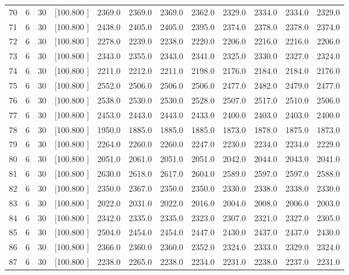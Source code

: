 \documentclass[12pt,a4paper]{article}
\begin{document}
\begin{center}
{\begin{tabular}{r r r r r r r r r r r r}
  70&  6& 30&[100.800   ]&  2369.0&  2369.0&  2369.0&  2362.0&  2329.0&  2334.0&  2334.0&  2329.0\\[-0.02in]
  71&  6& 30&[100.800   ]&  2438.0&  2405.0&  2405.0&  2395.0&  2374.0&  2378.0&  2378.0&  2374.0\\[-0.02in]
  72&  6& 30&[100.800   ]&  2278.0&  2239.0&  2238.0&  2220.0&  2206.0&  2216.0&  2216.0&  2206.0\\[-0.02in]
  73&  6& 30&[100.800   ]&  2343.0&  2355.0&  2343.0&  2341.0&  2325.0&  2330.0&  2327.0&  2324.0\\[-0.02in]
  74&  6& 30&[100.800   ]&  2211.0&  2212.0&  2211.0&  2198.0&  2176.0&  2184.0&  2184.0&  2176.0\\[-0.02in]
  75&  6& 30&[100.800   ]&  2552.0&  2506.0&  2506.0&  2506.0&  2477.0&  2482.0&  2479.0&  2477.0\\[-0.02in]
  76&  6& 30&[100.800   ]&  2538.0&  2530.0&  2530.0&  2528.0&  2507.0&  2517.0&  2510.0&  2506.0\\[-0.02in]
  77&  6& 30&[100.800   ]&  2453.0&  2443.0&  2443.0&  2433.0&  2400.0&  2403.0&  2403.0&  2400.0\\[-0.02in]
  78&  6& 30&[100.800   ]&  1950.0&  1885.0&  1885.0&  1885.0&  1873.0&  1878.0&  1875.0&  1873.0\\[-0.02in]
  79&  6& 30&[100.800   ]&  2264.0&  2260.0&  2260.0&  2247.0&  2230.0&  2234.0&  2234.0&  2229.0\\[-0.02in]
  80&  6& 30&[100.800   ]&  2051.0&  2061.0&  2051.0&  2051.0&  2042.0&  2044.0&  2043.0&  2041.0\\[-0.02in]
  81&  6& 30&[100.800   ]&  2630.0&  2618.0&  2617.0&  2604.0&  2589.0&  2597.0&  2597.0&  2588.0\\[-0.02in]
  82&  6& 30&[100.800   ]&  2350.0&  2367.0&  2350.0&  2350.0&  2330.0&  2338.0&  2338.0&  2330.0\\[-0.02in]
  83&  6& 30&[100.800   ]&  2022.0&  2031.0&  2022.0&  2016.0&  2004.0&  2008.0&  2006.0&  2003.0\\[-0.02in]
  84&  6& 30&[100.800   ]&  2342.0&  2335.0&  2335.0&  2323.0&  2307.0&  2321.0&  2327.0&  2305.0\\[-0.02in]
  85&  6& 30&[100.800   ]&  2504.0&  2454.0&  2454.0&  2447.0&  2430.0&  2437.0&  2437.0&  2430.0\\[-0.02in]
  86&  6& 30&[100.800   ]&  2366.0&  2360.0&  2360.0&  2352.0&  2324.0&  2333.0&  2329.0&  2324.0\\[-0.02in]
  87&  6& 30&[100.800   ]&  2238.0&  2265.0&  2238.0&  2234.0&  2231.0&  2238.0&  2237.0&  2231.0\\[-0.02in]

\end{tabular}}
\end{center}
\end{document}
